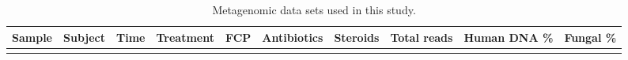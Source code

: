  \newpage
{\footnotesize
\renewcommand{\arraystretch}{0.7} \setlength{\tabcolsep}{3pt}
\begin{longtable}{ | r | r | r | r | r | r | r | r | r | r | }
\caption[Metagenomic data sets used in this study]{Metagenomic data sets used in this study.} 
\label{TS1} \\

\hline 
Sample & Subject & Time & Treatment & FCP & Antibiotics & Steroids & Total reads & Human DNA \% & Fungal \%\\
\hline 
\endfirsthead


\endfoot

\hline \hline
\endlastfoot


\end{longtable}}
